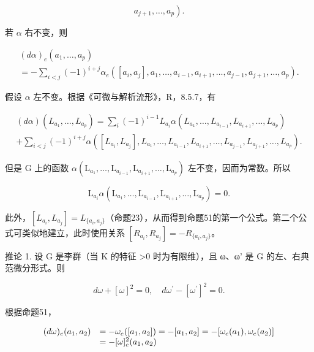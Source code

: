 \[
\left. a _ {j + 1}, \dots , a _ {p}\right).
\]

若 \(\alpha\) 右不变，则

\[
\begin{array}{l} (d \alpha) _ {e} (a _ {1}, \dots , a _ {p}) \\ = - \sum_ {i <   j} (- 1) ^ {i + j} \alpha_ {e} ([ a _ {i}, a _ {j} ], a _ {1}, \dots , a _ {i - 1}, a _ {i + 1}, \dots , a _ {j - 1}, a _ {j + 1}, \dots , a _ {p}). \end{array}
\]

假设 \(\alpha\) 左不变。根据《可微与解析流形》，R，8.5.7，有

\[
\begin{array}{l} (d \alpha) (L _ {a _ {1}}, \ldots , L _ {a _ {p}}) = \sum_ {i} (- 1) ^ {i - 1} L _ {a _ {i}} \alpha (L _ {a _ {1}}, \ldots , L _ {a _ {i - 1}}, L _ {a _ {i + 1}}, \ldots , L _ {a _ {p}}) \\ + \sum_ {i <   j} (- 1) ^ {i + j} \alpha ([ L _ {a _ {i}}, L _ {a _ {j}} ], L _ {a _ {1}}, \ldots , L _ {a _ {i - 1}}, L _ {a _ {i + 1}}, \ldots , L _ {a _ {j - 1}}, L _ {a _ {j + 1}}, \ldots , L _ {a _ {p}}). \end{array}
\]

但是 G 上的函数 \(\alpha (\mathrm{L}_{a_1},\dots ,\mathrm{L}_{a_{i - 1}},\mathrm{L}_{a_{i + 1}},\dots ,\mathrm{L}_{a_p})\) 左不变，因而为常数。所以

\[
\mathrm{L} _ {a _ {i}} \alpha (\mathrm{L} _ {a _ {1}}, \dots , \mathrm{L} _ {a _ {i - 1}}, \mathrm{L} _ {a _ {i + 1}}, \dots , \mathrm{L} _ {a _ {p}}) = 0.
\]

此外，\([L_{a_{i}}, L_{a_{j}}] = L_{\{a_{i}, a_{j}\}}\)（命题23），从而得到命题51的第一个公式。第二个公式可类似地建立，此时使用关系 \([R_{a_{i}}, R_{a_{j}}] = -R_{\{a_{i}, a_{j}\}}\)。

推论 1. 设 G 是李群（当 K 的特征 \textgreater0 时为有限维），且 ω、ω' 是 G 的左、右典范微分形式。则

\[
d \omega + [ \omega ] ^ {2} = 0, \quad d \omega^ {\prime} - [ \omega^ {\prime} ] ^ {2} = 0.
\]

根据命题51，

\[
\begin{array}{r l} (d \omega) _ {e} (a _ {1}, a _ {2}) & = - \omega_ {e} ([ a _ {1}, a _ {2} ]) = - [ a _ {1}, a _ {2} ] = - [ \omega_ {e} (a _ {1}), \omega_ {e} (a _ {2}) ] \\ & = - [ \omega ] _ {e} ^ {2} (a _ {1}, a _ {2}) \end{array}
\]

